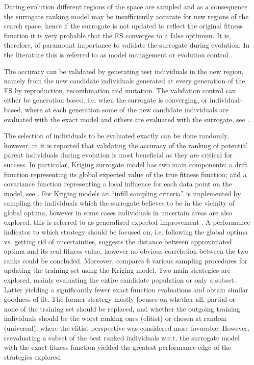 \documentclass[10pt, conference]{IEEEtran} %
\begin{document}
During evolution different regions of the space are sampled and as a consequence the surrogate ranking model may be insufficiently accurate for new regions of the search space, hence if the surrogate is not updated to reflect the original fitness function it is very probable that the ES converges to a false optimum. It is, therefore, of paramount importance to validate the surrogate during evolution. In the literature this is referred to as model management or evolution control \cite{Jin05}.

The accuracy can be validated by generating test individuals  in the new region, namely from the new candidate individuals generated at every generation of the ES by reproduction, recombination and mutation. The validation control can either be generation based, i.e. when the surrogate is converging, or individual-based, where  at each generation some of the new candidate individuals are evaluated with the exact model and others are evaluated with the surrogate, see \cite{Jin05}. 

The selection of individuals  to be evaluated exactly can be done randomly, however, in \cite{Ru04:PPSN} it is reported that validating the accuracy of the ranking of potential parent individuals  during evolution is most beneficial as they are critical for success.  %
In particular, Kriging surrogate model has two main components: a drift function representing its global expected value of the true fitness function; and a covariance function representing a local influence for each data point on the model, see \cite{Ratle1999}. %
For Kriging models an ``infill sampling criteria'' is implemented by sampling the individuals  which the surrogate believes to be in the vicinity of global optima, however in some cases individuals  in uncertain areas are also explored, this is referred to as generalized expected improvement \cite{Sasena2002}. A performance indicator to which strategy should be focused on, i.e. following the global optima vs. getting rid of uncertainties, \cite{Ponweiser2008} suggests the distance between approximated optima and its real fitness value, however no obvious correlation between the two ranks could be concluded. Moreover, \cite{Ratle1999} compares 6 various sampling procedures for updating the training set using the Kriging model. Two main strategies are explored, mainly evaluating the entire candidate population or only a subset. Latter yielding a significantly fewer exact function evaluations and obtain similar goodness of fit. The former strategy mostly focuses on whether all, partial or none of the training set should be replaced, and whether the outgoing training individuals  should be the worst ranking ones (elitist) or chosen at random (universal), where the elitist perspective was considered more favorable. However, reevaluating a subset of the best ranked individuals  w.r.t. the surrogate model with the exact fitness function yielded the greatest performance edge of the strategies explored. 
\end{document}
